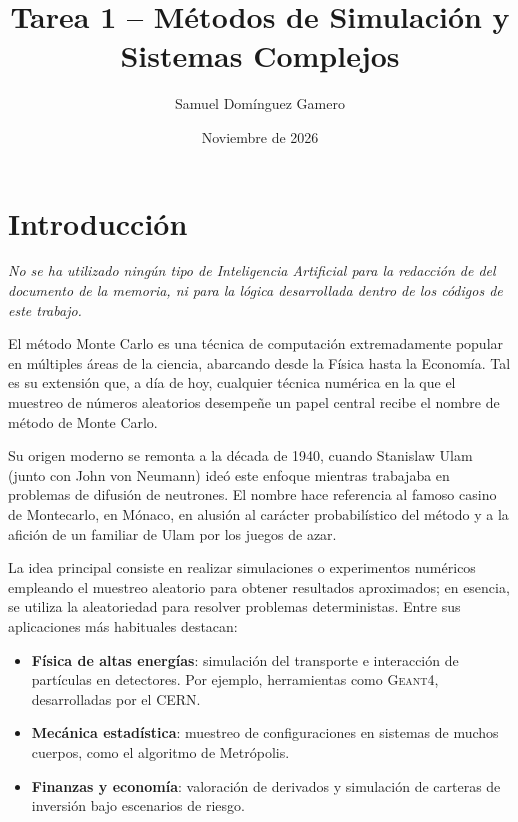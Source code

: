 \documentclass[11pt, a4paper]{article}
\title{\textbf{Tarea 1 -- Métodos de Simulación y Sistemas Complejos}}
\author{Samuel Domínguez Gamero}
\date{Noviembre de 2026}
\begin{document}
\maketitle
\tableofcontents
\newpage



\section{Introducción}
\textit{No se ha utilizado ningún tipo de Inteligencia Artificial para la redacción de del documento de la memoria, ni para la lógica desarrollada dentro de los códigos de este trabajo.}

El método Monte Carlo es una técnica de computación extremadamente popular en múltiples áreas de la ciencia, abarcando desde la Física hasta la Economía. Tal es su extensión que, a día de hoy, cualquier técnica numérica en la que el muestreo de números aleatorios desempeñe un papel central recibe el nombre de método de Monte Carlo.

Su origen moderno se remonta a la década de 1940, cuando Stanislaw Ulam (junto con John von Neumann) ideó este enfoque mientras trabajaba en problemas de difusión de neutrones. El nombre hace referencia al famoso casino de Montecarlo, en Mónaco, en alusión al carácter probabilístico del método y a la afición de un familiar de Ulam por los juegos de azar.

La idea principal consiste en realizar simulaciones o experimentos numéricos empleando el muestreo aleatorio para obtener resultados aproximados; en esencia, se utiliza la aleatoriedad para resolver problemas deterministas. Entre sus aplicaciones más habituales destacan:
\begin{itemize}
    \item \textbf{Física de altas energías}: simulación del transporte e interacción de partículas en detectores. Por ejemplo, herramientas como \textsc{Geant4}, desarrolladas por el CERN.
    \item \textbf{Mecánica estadística}: muestreo de configuraciones en sistemas de muchos cuerpos, como el algoritmo de Metrópolis.
    \item \textbf{Finanzas y economía}: valoración de derivados y simulación de carteras de inversión bajo escenarios de riesgo.
\end{itemize}
\end{document}
